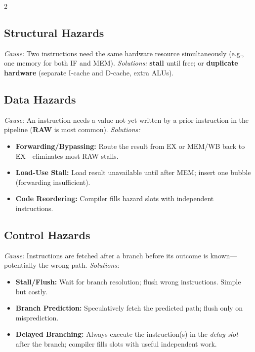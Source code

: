 \documentclass[9pt]{article}
\begin{document}
\begin{multicols}{2}

\subsection{Structural Hazards}
\textit{Cause:} Two instructions need the same hardware resource simultaneously (e.g., one memory for both IF and MEM).
\textit{Solutions:} \textbf{stall} until free; or \textbf{duplicate hardware} (separate I-cache and D-cache, extra ALUs).

\vspace{4pt}
\subsection{Data Hazards}
\textit{Cause:} An instruction needs a value not yet written by a prior instruction in the pipeline (\textbf{RAW} is most common).
\textit{Solutions:}
\begin{itemize}
  \item \textbf{Forwarding/Bypassing:} Route the result from EX or MEM/WB back to EX---eliminates most RAW stalls.
  \item \textbf{Load-Use Stall:} Load result unavailable until after MEM; insert one bubble (forwarding insufficient).
  \item \textbf{Code Reordering:} Compiler fills hazard slots with independent instructions.
\end{itemize}

\columnbreak

\subsection{Control Hazards}
\textit{Cause:} Instructions are fetched after a branch before its outcome is known---potentially the wrong path.
\textit{Solutions:}
\begin{itemize}
  \item \textbf{Stall/Flush:} Wait for branch resolution; flush wrong instructions. Simple but costly.
  \item \textbf{Branch Prediction:} Speculatively fetch the predicted path; flush only on misprediction.
  \item \textbf{Delayed Branching:} Always execute the instruction(s) in the \emph{delay slot} after the branch; compiler fills slots with useful independent work.
\end{itemize}

\end{multicols}
\end{document}
